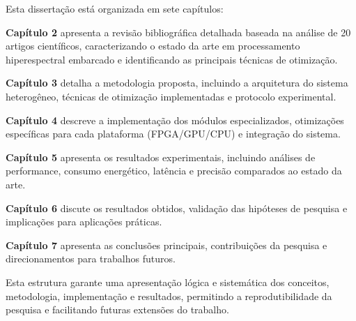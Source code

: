 Esta dissertação está organizada em sete capítulos:

\textbf{Capítulo 2} apresenta a revisão bibliográfica detalhada baseada na análise de 20 artigos científicos, caracterizando o estado da arte em processamento hiperespectral embarcado e identificando as principais técnicas de otimização.

\textbf{Capítulo 3} detalha a metodologia proposta, incluindo a arquitetura do sistema heterogêneo, técnicas de otimização implementadas e protocolo experimental.

\textbf{Capítulo 4} descreve a implementação dos módulos especializados, otimizações específicas para cada plataforma (FPGA/GPU/CPU) e integração do sistema.

\textbf{Capítulo 5} apresenta os resultados experimentais, incluindo análises de performance, consumo energético, latência e precisão comparados ao estado da arte.

\textbf{Capítulo 6} discute os resultados obtidos, validação das hipóteses de pesquisa e implicações para aplicações práticas.

\textbf{Capítulo 7} apresenta as conclusões principais, contribuições da pesquisa e direcionamentos para trabalhos futuros.

Esta estrutura garante uma apresentação lógica e sistemática dos conceitos, metodologia, implementação e resultados, permitindo a reprodutibilidade da pesquisa e facilitando futuras extensões do trabalho.